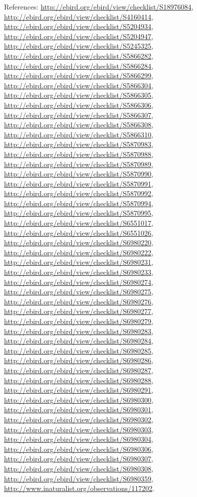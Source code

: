\documentclass[9pt, article]{memoir}
\begin{document}
\begin{multicols}{2}
References: 
\url{http://ebird.org/ebird/view/checklist/S18976084}, 
\url{http://ebird.org/ebird/view/checklist/S4160414}, 
\url{http://ebird.org/ebird/view/checklist/S5204934}, 
\url{http://ebird.org/ebird/view/checklist/S5204947}, 
\url{http://ebird.org/ebird/view/checklist/S5245325}, 
\url{http://ebird.org/ebird/view/checklist/S5866282}, 
\url{http://ebird.org/ebird/view/checklist/S5866284}, 
\url{http://ebird.org/ebird/view/checklist/S5866299}, 
\url{http://ebird.org/ebird/view/checklist/S5866304}, 
\url{http://ebird.org/ebird/view/checklist/S5866305}, 
\url{http://ebird.org/ebird/view/checklist/S5866306}, 
\url{http://ebird.org/ebird/view/checklist/S5866307}, 
\url{http://ebird.org/ebird/view/checklist/S5866308}, 
\url{http://ebird.org/ebird/view/checklist/S5866310}, 
\url{http://ebird.org/ebird/view/checklist/S5870983}, 
\url{http://ebird.org/ebird/view/checklist/S5870988}, 
\url{http://ebird.org/ebird/view/checklist/S5870989}, 
\url{http://ebird.org/ebird/view/checklist/S5870990}, 
\url{http://ebird.org/ebird/view/checklist/S5870991}, 
\url{http://ebird.org/ebird/view/checklist/S5870992}, 
\url{http://ebird.org/ebird/view/checklist/S5870994}, 
\url{http://ebird.org/ebird/view/checklist/S5870995}, 
\url{http://ebird.org/ebird/view/checklist/S6551017}, 
\url{http://ebird.org/ebird/view/checklist/S6551026}, 
\url{http://ebird.org/ebird/view/checklist/S6980220}, 
\url{http://ebird.org/ebird/view/checklist/S6980222}, 
\url{http://ebird.org/ebird/view/checklist/S6980231}, 
\url{http://ebird.org/ebird/view/checklist/S6980233}, 
\url{http://ebird.org/ebird/view/checklist/S6980274}, 
\url{http://ebird.org/ebird/view/checklist/S6980275}, 
\url{http://ebird.org/ebird/view/checklist/S6980276}, 
\url{http://ebird.org/ebird/view/checklist/S6980277}, 
\url{http://ebird.org/ebird/view/checklist/S6980279}, 
\url{http://ebird.org/ebird/view/checklist/S6980283}, 
\url{http://ebird.org/ebird/view/checklist/S6980284}, 
\url{http://ebird.org/ebird/view/checklist/S6980285}, 
\url{http://ebird.org/ebird/view/checklist/S6980286}, 
\url{http://ebird.org/ebird/view/checklist/S6980287}, 
\url{http://ebird.org/ebird/view/checklist/S6980288}, 
\url{http://ebird.org/ebird/view/checklist/S6980291}, 
\url{http://ebird.org/ebird/view/checklist/S6980300}, 
\url{http://ebird.org/ebird/view/checklist/S6980301}, 
\url{http://ebird.org/ebird/view/checklist/S6980302}, 
\url{http://ebird.org/ebird/view/checklist/S6980303}, 
\url{http://ebird.org/ebird/view/checklist/S6980304}, 
\url{http://ebird.org/ebird/view/checklist/S6980306}, 
\url{http://ebird.org/ebird/view/checklist/S6980307}, 
\url{http://ebird.org/ebird/view/checklist/S6980308}, 
\url{http://ebird.org/ebird/view/checklist/S6980359}, 
\url{http://www.inaturalist.org/observations/117202}.


\end{multicols}
\end{document}
